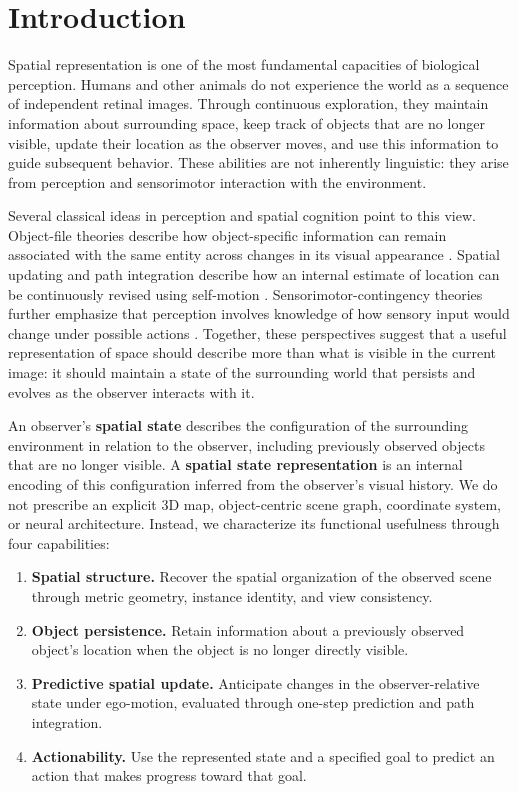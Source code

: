 \documentclass{article} %
\begin{document}
\section{Introduction}
\label{sec:introduction}

Spatial representation is one of the most fundamental capacities of biological
perception. Humans and other animals do not experience the world as a sequence
of independent retinal images. Through continuous exploration, they maintain
information about surrounding space, keep track of objects that are no longer
visible, update their location as the observer moves, and use this information
to guide subsequent behavior. These abilities are not inherently linguistic:
they arise from perception and sensorimotor interaction with the environment.

Several classical ideas in perception and spatial cognition point to this
view. Object-file theories describe how object-specific information can remain
associated with the same entity across changes in its visual appearance
\citep{KAHNEMAN1992175}. Spatial updating and path integration describe
how an internal estimate of location can be continuously revised using
self-motion \citep{McNaughton2006}. Sensorimotor-contingency
theories further emphasize that perception involves knowledge of how sensory
input would change under possible actions
\citep{oregan2001}. Together, these perspectives suggest that a
useful representation of space should describe more than what is visible in
the current image: it should maintain a state of the surrounding world that
persists and evolves as the observer interacts with it.


An observer's \textbf{spatial state} describes the configuration of the
surrounding environment in relation to the observer, including previously
observed objects that are no longer visible. A \textbf{spatial state
representation} is an internal encoding of this configuration inferred from
the observer's visual history. We do not prescribe an explicit 3D map,
object-centric scene graph, coordinate system, or neural architecture.
Instead, we characterize its functional usefulness through four capabilities:

\begin{enumerate}
  \item[\textbf{L1}] \textbf{Spatial structure.}
  Recover the spatial organization of the observed scene through metric
  geometry, instance identity, and view consistency.
  \item[\textbf{L2}] \textbf{Object persistence.}
  Retain information about a previously observed object's location when the
  object is no longer directly visible.
  \item[\textbf{L3}] \textbf{Predictive spatial update.}
  Anticipate changes in the observer-relative state under ego-motion,
  evaluated through one-step prediction and path integration.
  \item[\textbf{L4}] \textbf{Actionability.}
  Use the represented state and a specified goal to predict an action that
  makes progress toward that goal.
\end{enumerate}
\end{document}

